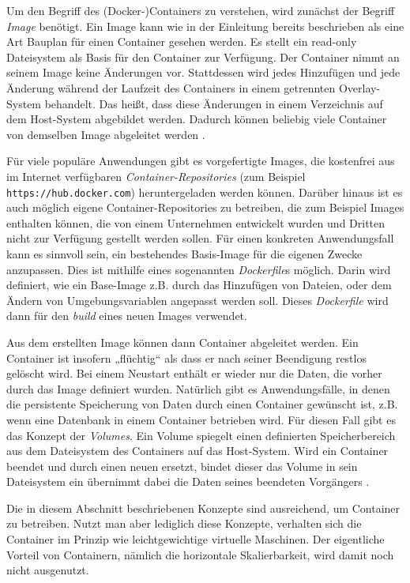 \documentclass[11pt,a4paper]{article}
\begin{document}
Um den Begriff des (Docker-)Containers zu verstehen, wird zunächst der Begriff \emph{Image} benötigt.
Ein Image kann wie in der Einleitung bereits beschrieben als eine Art Bauplan für einen Container gesehen werden.
Es stellt ein read-only Dateisystem als Basis für den Container zur Verfügung. Der Container nimmt an seinem Image
keine Änderungen vor. Stattdessen wird jedes Hinzufügen und jede Änderung während der Laufzeit des Containers in einem
getrennten Overlay-System behandelt.
Das heißt, dass diese Änderungen in einem Verzeichnis auf dem Host-System abgebildet werden.
Dadurch können beliebig viele Container von demselben Image abgeleitet werden \cite{kofler2021docker}.

Für viele populäre Anwendungen gibt es vorgefertigte Images, die kostenfrei aus im Internet verfügbaren
\emph{Container-Repositories} (zum Beispiel \lstinline|https://hub.docker.com|) heruntergeladen werden können.
Darüber hinaus ist es auch möglich eigene Container-Repositories zu betreiben,
die zum Beispiel Images enthalten können, die von einem Unternehmen entwickelt wurden
und Dritten nicht zur Verfügung gestellt werden sollen.
Für einen konkreten Anwendungsfall kann es sinnvoll sein, ein bestehendes Basis-Image für die eigenen Zwecke anzupassen.
Dies ist mithilfe eines sogenannten \emph{Dockerfile}s möglich. Darin wird definiert, wie ein Base-Image z.B. durch das Hinzufügen von Dateien,
oder dem Ändern von Umgebungsvariablen angepasst werden soll. Dieses \emph{Dockerfile} wird dann für den \emph{build}
eines neuen Images verwendet. \cite{kofler2021docker}

Aus dem erstellten Image können dann Container abgeleitet werden. Ein Container ist insofern „flüchtig“ als dass er nach seiner
Beendigung restlos gelöscht wird. Bei einem Neustart enthält er wieder nur die Daten, die vorher durch das Image definiert wurden.
Natürlich gibt es Anwendungsfälle, in denen die persistente Speicherung von Daten durch einen Container gewünscht ist, z.B. wenn
eine Datenbank in einem Container betrieben wird. Für diesen Fall gibt es das Konzept der \emph{Volumes}.
Ein Volume spiegelt einen definierten Speicherbereich aus dem Dateisystem des Containers auf das Host-System.
Wird ein Container beendet und durch einen neuen ersetzt, bindet dieser das Volume in sein Dateisystem ein übernimmt
dabei die Daten seines beendeten Vorgängers \cite{kofler2021docker}.

Die in diesem Abschnitt beschriebenen Konzepte sind ausreichend, um Container zu betreiben.
Nutzt man aber lediglich diese Konzepte, verhalten sich die Container im Prinzip wie leichtgewichtige virtuelle Maschinen.
Der eigentliche Vorteil von Containern, nämlich die horizontale Skalierbarkeit, wird damit noch nicht ausgenutzt.
\end{document}
